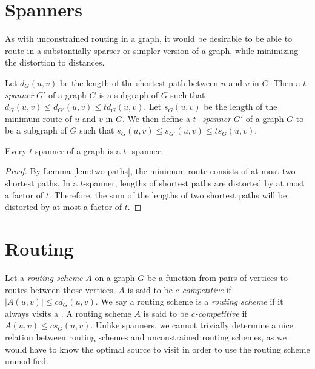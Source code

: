 \documentclass{cccg13}
\begin{document}

\section{\Supplied{} Spanners}
As with unconstrained routing in a graph, it would be desirable to be able to route in a substantially sparser or simpler version of a graph, while minimizing the distortion to distances.

Let $d_G(u,v)$ be the length of the shortest path between $u$ and $v$ in $G$. Then a \emph{$t$-spanner} $G'$ of a graph $G$ is a subgraph of $G$ such that 
$d_G(u,v) \leq d_{G'}(u,v) \leq t d_G(u,v)$. 
Let $s_G(u,v)$ be the length of the minimum \supplied{} route of $u$ and $v$ in $G$. We then define a \emph{$t$-\supplied{}-spanner} $G'$ of a graph $G$ to be a subgraph of $G$ such that 
$s_G(u,v) \leq s_{G'}(u,v) \leq t s_G(u,v)$.

\begin{lemma}
    Every $t$-spanner of a graph is a $t$-\supplied{}-spanner.
\end{lemma}

\begin{proof}
    By Lemma \ref{lem:two-paths}, the minimum \supplied{} route consists of at most two shortest paths. In a $t$-spanner, lengths of shortest paths are distorted by at most a factor of $t$. Therefore, the sum of the lengths of two shortest paths will be distorted by at most a factor of $t$.
\end{proof}





\section{Routing}

Let a \emph{routing scheme} $A$ on a graph $G$ be a function from pairs of vertices to routes between those vertices. $A$ is said to be \emph{$c$-competitive} if $|A(u,v)| \leq c d_G(u,v)$. We say a routing scheme is a \emph{\supplied{} routing scheme} if it always visits a \supplier{}. A \supplied{} routing scheme $A$ is said to be \emph{$c$-competitive} if $A(u,v) \leq c s_G(u,v)$. Unlike spanners, we cannot trivially determine a nice relation between \supplied{} routing schemes and unconstrained routing schemes, as we would have to know the optimal source to visit in order to use the routing scheme unmodified.
\end{document}
